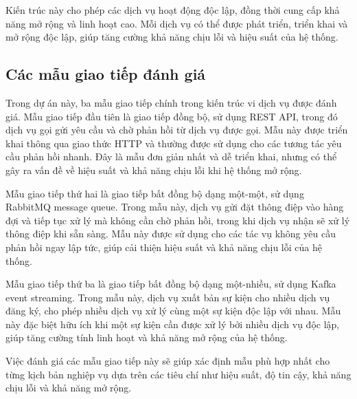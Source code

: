 Kiến trúc này cho phép các dịch vụ hoạt động độc lập, đồng thời cung cấp khả năng mở rộng và linh hoạt cao. Mỗi dịch vụ có thể được phát triển, triển khai và mở rộng độc lập, giúp tăng cường khả năng chịu lỗi và hiệu suất của hệ thống.

\subsection{Các mẫu giao tiếp đánh giá}
Trong dự án này, ba mẫu giao tiếp chính trong kiến trúc vi dịch vụ được đánh giá. Mẫu giao tiếp đầu tiên là giao tiếp đồng bộ, sử dụng REST API, trong đó dịch vụ gọi gửi yêu cầu và chờ phản hồi từ dịch vụ được gọi. Mẫu này được triển khai thông qua giao thức HTTP và thường được sử dụng cho các tương tác yêu cầu phản hồi nhanh. Đây là mẫu đơn giản nhất và dễ triển khai, nhưng có thể gây ra vấn đề về hiệu suất và khả năng chịu lỗi khi hệ thống mở rộng.

Mẫu giao tiếp thứ hai là giao tiếp bất đồng bộ dạng một-một, sử dụng RabbitMQ message queue. Trong mẫu này, dịch vụ gửi đặt thông điệp vào hàng đợi và tiếp tục xử lý mà không cần chờ phản hồi, trong khi dịch vụ nhận sẽ xử lý thông điệp khi sẵn sàng. Mẫu này được sử dụng cho các tác vụ không yêu cầu phản hồi ngay lập tức, giúp cải thiện hiệu suất và khả năng chịu lỗi của hệ thống.

Mẫu giao tiếp thứ ba là giao tiếp bất đồng bộ dạng một-nhiều, sử dụng Kafka event streaming. Trong mẫu này, dịch vụ xuất bản sự kiện cho nhiều dịch vụ đăng ký, cho phép nhiều dịch vụ xử lý cùng một sự kiện độc lập với nhau. Mẫu này đặc biệt hữu ích khi một sự kiện cần được xử lý bởi nhiều dịch vụ độc lập, giúp tăng cường tính linh hoạt và khả năng mở rộng của hệ thống.

Việc đánh giá các mẫu giao tiếp này sẽ giúp xác định mẫu phù hợp nhất cho từng kịch bản nghiệp vụ dựa trên các tiêu chí như hiệu suất, độ tin cậy, khả năng chịu lỗi và khả năng mở rộng.